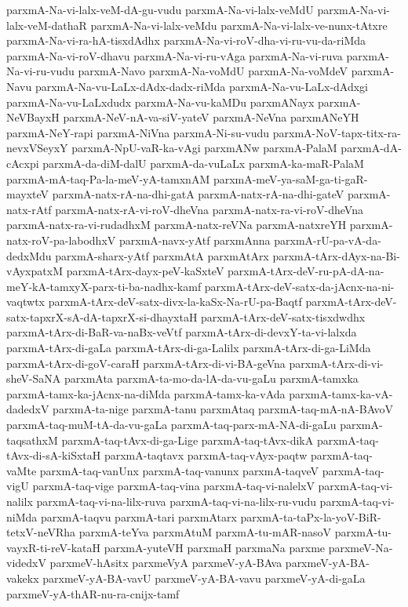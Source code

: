 {parxmA-Na-vi-lalx-veM-dA-gu-vudu
parxmA-Na-vi-lalx-veMdU
parxmA-Na-vi-lalx-veM-dathaR
parxmA-Na-vi-lalx-veMdu
parxmA-Na-vi-lalx-ve-nunx-tAtxre
parxmA-Na-vi-ra-hA-tisxdAdhx
parxmA-Na-vi-roV-dha-vi-ru-vu-da-riMda
parxmA-Na-vi-roV-dhavu
parxmA-Na-vi-ru-vAga
parxmA-Na-vi-ruva
parxmA-Na-vi-ru-vudu
parxmA-Navo
parxmA-Na-voMdU
parxmA-Na-voMdeV
parxmA-Navu
parxmA-Na-vu-LaLx-dAdx-dadx-riMda
parxmA-Na-vu-LaLx-dAdxgi
parxmA-Na-vu-LaLxdudx
parxmA-Na-vu-kaMDu
parxmANayx
parxmA-NeVBayxH
parxmA-NeV-nA-va-siV-yateV
parxmA-NeVna
parxmANeYH
parxmA-NeY-rapi
parxmA-NiVna
parxmA-Ni-su-vudu
parxmA-NoV-tapx-titx-ra-nevxVSeyxY
parxmA-NpU-vaR-ka-vAgi
parxmANw
parxmA-PalaM
parxmA-dA-cAcxpi
parxmA-da-diM-dalU
parxmA-da-vuLaLx
parxmA-ka-maR-PalaM
parxmA-mA-taq-Pa-la-meV-yA-tamxnAM
parxmA-meV-ya-saM-ga-ti-gaR-mayxteV
parxmA-natx-rA-na-dhi-gatA
parxmA-natx-rA-na-dhi-gateV
parxmA-natx-rAtf
parxmA-natx-rA-vi-roV-dheVna
parxmA-natx-ra-vi-roV-dheVna
parxmA-natx-ra-vi-rudadhxM
parxmA-natx-reVNa
parxmA-natxreYH
parxmA-natx-roV-pa-labodhxV
parxmA-navx-yAtf
parxmAnna
parxmA-rU-pa-vA-da-dedxMdu
parxmA-sharx-yAtf
parxmAtA
parxmAtArx
parxmA-tArx-dAyx-na-Bi-vAyxpatxM
parxmA-tArx-dayx-peV-kaSxteV
parxmA-tArx-deV-ru-pA-dA-na-meY-kA-tamxyX-parx-ti-ba-nadhx-kamf
parxmA-tArx-deV-satx-da-jAcnx-na-ni-vaqtwtx
parxmA-tArx-deV-satx-divx-la-kaSx-Na-rU-pa-Baqtf
parxmA-tArx-deV-satx-tapxrX-sA-dA-tapxrX-si-dhayxtaH
parxmA-tArx-deV-satx-tisxdwdhx
parxmA-tArx-di-BaR-va-naBx-veVtf
parxmA-tArx-di-devxY-ta-vi-lalxda
parxmA-tArx-di-gaLa
parxmA-tArx-di-ga-Lalilx
parxmA-tArx-di-ga-LiMda
parxmA-tArx-di-goV-caraH
parxmA-tArx-di-vi-BA-geVna
parxmA-tArx-di-vi-sheV-SaNA
parxmAta
parxmA-ta-mo-da-lA-da-vu-gaLu
parxmA-tamxka
parxmA-tamx-ka-jAcnx-na-diMda
parxmA-tamx-ka-vAda
parxmA-tamx-ka-vA-dadedxV
parxmA-ta-nige
parxmA-tanu
parxmAtaq
parxmA-taq-mA-nA-BAvoV
parxmA-taq-muM-tA-da-vu-gaLa
parxmA-taq-parx-mA-NA-di-gaLu
parxmA-taqsathxM
parxmA-taq-tAvx-di-ga-Lige
parxmA-taq-tAvx-dikA
parxmA-taq-tAvx-di-sA-kiSxtaH
parxmA-taqtavx
parxmA-taq-vAyx-paqtw
parxmA-taq-vaMte
parxmA-taq-vanUnx
parxmA-taq-vanunx
parxmA-taqveV
parxmA-taq-vigU
parxmA-taq-vige
parxmA-taq-vina
parxmA-taq-vi-nalelxV
parxmA-taq-vi-nalilx
parxmA-taq-vi-na-lilx-ruva
parxmA-taq-vi-na-lilx-ru-vudu
parxmA-taq-vi-niMda
parxmA-taqvu
parxmA-tari
parxmAtarx
parxmA-ta-taPx-la-yoV-BiR-tetxV-neVRha
parxmA-teYva
parxmAtuM
parxmA-tu-mAR-nasoV
parxmA-tu-vayxR-ti-reV-kataH
parxmA-yuteVH
parxmaH
parxmaNa
parxme
parxmeV-Na-videdxV
parxmeV-hAsitx
parxmeVyA
parxmeV-yA-BAva
parxmeV-yA-BA-vakekx
parxmeV-yA-BA-vavU
parxmeV-yA-BA-vavu
parxmeV-yA-di-gaLa
parxmeV-yA-thAR-nu-ra-cnijx-tamf
}

